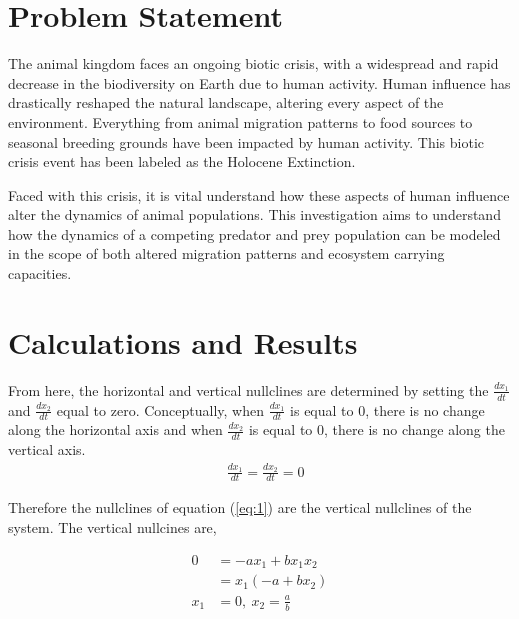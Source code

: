 \documentclass[12pt]{article}   %
\theoremstyle{definition}
\numberwithin{equation}{section}
\begin{document}
\setcounter{page}{2}
\section{Problem Statement} \label{APPM2360proj01sec01}
\quad The animal kingdom faces an ongoing biotic crisis, with a widespread and rapid decrease in the biodiversity on Earth due to human activity. Human influence has drastically reshaped the natural landscape, altering every aspect of the environment. Everything from animal migration patterns to food sources to seasonal breeding grounds have been impacted by human activity. This biotic crisis event has been labeled as the Holocene Extinction.

\quad Faced with this crisis, it is vital understand how these aspects of human influence alter the dynamics of animal populations. This investigation aims to understand how the dynamics of a competing predator and prey population can be modeled in the scope of both altered migration patterns and ecosystem carrying capacities.      

 



\setcounter{page}{2}
\section{Calculations and Results} \label{APPM2360proj01sec01} 

\quad From here, the horizontal and vertical nullclines are determined by setting the $\frac{dx_1}{dt}$ and $\frac{dx_2}{dt}$ equal to zero. Conceptually, when $\frac{dx_1}{dt}$ is equal to 0, there is no change along the horizontal axis and when $\frac{dx_2}{dt}$ is equal to 0, there is no change along the vertical axis. 
\begin{align*}
  & \frac{dx_1}{dt} = \frac{dx_2}{dt} = 0
\end{align*}

\quad Therefore the nullclines of equation (\ref{eq:1}) are the vertical nullclines of the system. The vertical nullcines are,

\begin{align*}
  0 & =  -ax_1 + bx_1x_2 \\
  & = x_1(-a + bx_2) \\
  x_1 &= 0, \ x_2 = \frac{a}{b}  
\end{align*}
\end{document}
